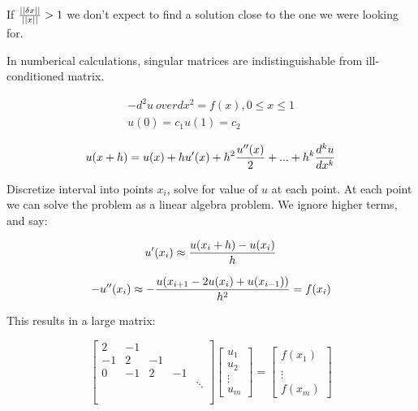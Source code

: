 \documentclass[12pt]{article}
\newcommand{\norm}[1]{\left|\left|#1\right|\right|}
\newcommand{\<}{\langle}
\renewcommand{\>}{\rangle}
\begin{document}
If ${\norm{\delta x} \over \norm{x}} > 1$ we don't expect to find a solution close to the one we were looking for.

In numberical calculations, singular matrices are indistinguishable from ill-conditioned matrix.


\[
	\begin{matrix}
		-{d^2 u \ over dx^2} = f(x), 0 \leq x \leq 1 \\
		u(0) = c_1
		u(1) = c_2
	\end{matrix}
\]

\[
	u(x+h) = u(x) + h u'(x) + h^2 {u''(x) \over 2} + ... + h^k {d^k u \over d x^k}
\]

Discretize interval into points $x_i$, solve for value of $u$ at each point. At each point we can solve the problem as a linear algebra problem. We ignore higher terms, and say:

\[
	u'(x_i) \approx {u(x_i+h) - u(x_i) \over h}
\]

\[
	-u''(x_i) \approx -{u(x_{i+1} - 2 u(x_i) + u(x_{i-1})) \over h^2 } = f(x_i)
\]

This results in a large matrix:

\[
	\begin{bmatrix}
		2 & -1 \\
		-1 & 2 & -1 \\
		0 & -1 & 2 & -1 \\
		 & & & & \ddots \\ \\ \\
	\end{bmatrix}
	\begin{bmatrix}
		u_1 \\ u_2 \\ \vdots \\ u_m
	\end{bmatrix}
	=
	\begin{bmatrix}
		f(x_1) \\ \\ \vdots \\ f(x_m)
	\end{bmatrix}
\]
\end{document}
